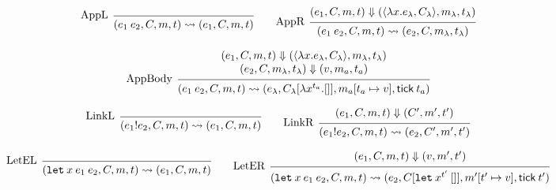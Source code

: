 \documentclass[acmsmall,screen]{acmart}
\theoremstyle{definition}
\newcommand*{\mem}{m}
\newcommand*{\link}[2]{{#1}\mathtt{!}{#2}}
\newcommand*{\tick}{\mathsf{tick}}
\begin{document}
\begin{figure}[htb]
  \centering
  \footnotesize
  \[
    \begin{prooftree}
      \infer[left label={AppL}]0{
      (e_{1}\:e_{2}, C, \mem, t)
      \rightsquigarrow
      (e_{1},C, \mem,t)
      }
    \end{prooftree}\qquad
    \begin{prooftree}
      \hypo{
        \begin{matrix}
          (e_{1}, C, \mem, t)
          \Downarrow
          (\langle\lambda x.e_{\lambda}, C_{\lambda}\rangle, \mem_{\lambda}, t_{\lambda})
        \end{matrix}
      }
      \infer[left label={AppR}]1{
      (e_{1}\:e_{2}, C, \mem, t)
      \rightsquigarrow
      (e_{2}, C, \mem_{\lambda}, t_{\lambda})
      }
    \end{prooftree}
  \]

  \[
    \begin{prooftree}
      \hypo{
        \begin{matrix}
          (e_{1}, C, \mem, t)
          \Downarrow
          (\langle\lambda x.e_{\lambda}, C_{\lambda}\rangle, \mem_{\lambda}, t_{\lambda}) \\
          (e_{2}, C, \mem_{\lambda}, t_{\lambda})
          \Downarrow
          (v, \mem_{a}, t_{a})
        \end{matrix}
      }
      \infer[left label={AppBody}]1{
      (e_{1}\:e_{2}, C, \mem, t)
      \rightsquigarrow
      (e_{\lambda}, C_{\lambda}[\lambda x^{t_{a}}.[]], \mem_{a}[t_{a}\mapsto v], \tick\:t_{a})
      }
    \end{prooftree}
  \]

  \[
    \begin{prooftree}
      \infer[left label=LinkL]0{
      (\link{e_{1}}{e_{2}}, C, \mem, t)
      \rightsquigarrow
      (e_{1}, C, \mem, t)
      }
    \end{prooftree}\qquad
    \begin{prooftree}
      \hypo{
        \begin{matrix}
          (e_{1}, C, \mem, t)
          \Downarrow
          (C', \mem', t')
        \end{matrix}
      }
      \infer[left label=LinkR]1{
      (\link{e_{1}}{e_{2}}, C, \mem, t)
      \rightsquigarrow
      (e_{2}, C', \mem', t')
      }
    \end{prooftree}
  \]

  \[
    \begin{prooftree}
      \infer[left label=LetEL]0{
      (\mathtt{let}\:x\:e_1\:e_2, C, \mem, t)
      \rightsquigarrow
      (e_{1}, C, \mem, t)
      }
    \end{prooftree}\qquad
    \begin{prooftree}
      \hypo{
        \begin{matrix}
          (e_{1}, C, \mem, t)
          \Downarrow
          (v, \mem', t')
        \end{matrix}
      }
      \infer[left label=LetER]1{
      (\mathtt{let}\:x\:e_1\:e_2, C, \mem, t)
      \rightsquigarrow
      (e_{2}, C[\mathtt{let}\:x^{t'}\:[]], \mem'[t'\mapsto v], \tick\:t')
      }
    \end{prooftree}
  \]


\end{figure}
\end{document}
